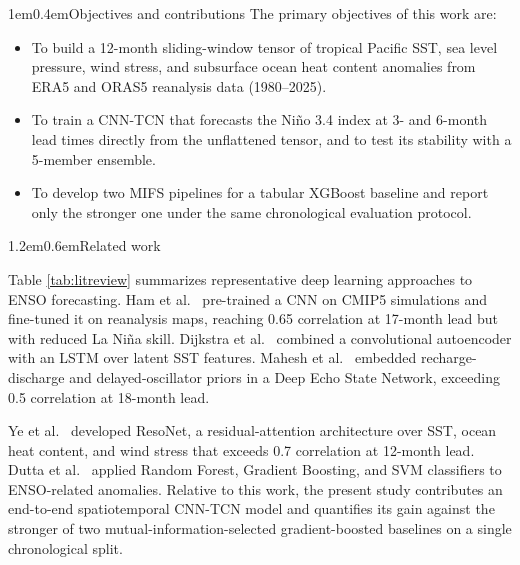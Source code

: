 \documentclass[10pt,a4paper]{article}
\makeatletter
\renewcommand\section{\@startsection{section}{1}{\z@}%
  {1.2em}{0.6em}{\normalfont\fontsize{10}{12}\selectfont\bfseries}}
\renewcommand\subsection{\@startsection{subsection}{2}{\z@}%
  {1em}{0.4em}{\normalfont\fontsize{10}{12}\selectfont\bfseries\itshape}}
\makeatother
\begin{document}
\subsection{Objectives and contributions}
The primary objectives of this work are:
\begin{itemize}[leftmargin=1.4em]
\item To build a 12-month sliding-window tensor of tropical Pacific SST, sea level pressure, wind stress, and subsurface ocean heat content anomalies from ERA5 and ORAS5 reanalysis data (1980--2025).
\item To train a CNN-TCN that forecasts the Ni\~no 3.4 index at 3- and 6-month lead times directly from the unflattened tensor, and to test its stability with a 5-member ensemble.
\item To develop two MIFS pipelines for a tabular XGBoost baseline and report only the stronger one under the same chronological evaluation protocol.
\end{itemize}

\section{Related work}

Table \ref{tab:litreview} summarizes representative deep learning approaches to ENSO forecasting. Ham et al.\ \cite{ham2019} pre-trained a CNN on CMIP5 simulations and fine-tuned it on reanalysis maps, reaching 0.65 correlation at 17-month lead but with reduced La Ni\~na skill. Dijkstra et al.\ \cite{dijkstra2019} combined a convolutional autoencoder with an LSTM over latent SST features. Mahesh et al.\ \cite{mahesh2024} embedded recharge-discharge and delayed-oscillator priors in a Deep Echo State Network, exceeding 0.5 correlation at 18-month lead.

Ye et al.\ \cite{ye2024} developed ResoNet, a residual-attention architecture over SST, ocean heat content, and wind stress that exceeds 0.7 correlation at 12-month lead. Dutta et al.\ \cite{dutta2024} applied Random Forest, Gradient Boosting, and SVM classifiers to ENSO-related anomalies. Relative to this work, the present study contributes an end-to-end spatiotemporal CNN-TCN model and quantifies its gain against the stronger of two mutual-information-selected gradient-boosted baselines on a single chronological split.
\end{document}

